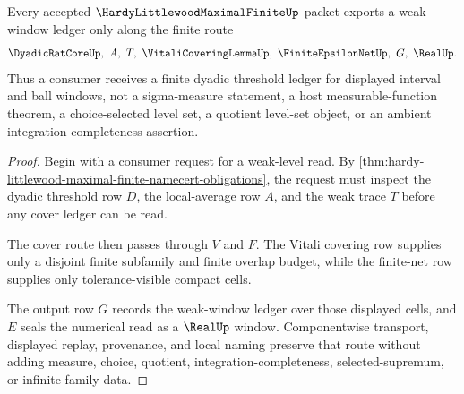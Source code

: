 \begin{theorem}
\label{thm:hardy-littlewood-maximal-finite-weak-window}
Every accepted $\HardyLittlewoodMaximalFiniteUp$ packet exports a weak-window ledger only along the finite route
$$
\DyadicRatCoreUp,\ A,\ T,\ \VitaliCoveringLemmaUp,\ \FiniteEpsilonNetUp,\ G,\ \RealUp .
$$
Thus a consumer receives a finite dyadic threshold ledger for displayed interval and ball windows, not a sigma-measure statement, a host measurable-function theorem, a choice-selected level set, a quotient level-set object, or an ambient integration-completeness assertion.
\end{theorem}
\begin{proof}
Begin with a consumer request for a weak-level read. By \autoref{thm:hardy-littlewood-maximal-finite-namecert-obligations}, the request must inspect the dyadic threshold row $D$, the local-average row $A$, and the weak trace $T$ before any cover ledger can be read.

The cover route then passes through $V$ and $F$. The Vitali covering row supplies only a disjoint finite subfamily and finite overlap budget, while the finite-net row supplies only tolerance-visible compact cells.

The output row $G$ records the weak-window ledger over those displayed cells, and $E$ seals the numerical read as a $\RealUp$ window. Componentwise transport, displayed replay, provenance, and local naming preserve that route without adding measure, choice, quotient, integration-completeness, selected-supremum, or infinite-family data.
\end{proof}



